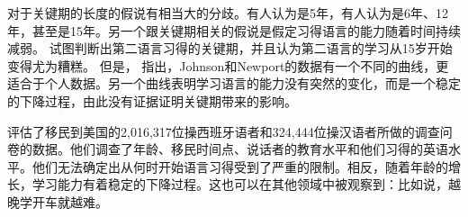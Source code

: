 对于关键期的长度的假说有相当大的分歧。有人认为是5年，有人认为是6年、12年，甚至是15年\citep[]{HBW2003a}。另一个跟关键期相关的假说是假定习得语言的能力随着时间持续减弱。
 \citet{JN89a}试图判断出第二语言习得的关键期，并且认为第二语言的学习从15岁开始变得尤为糟糕。\nocite{Sorace2003a}
但是， \citet*[\page]{EBJKSPP96a}指出，Johnson和Newport的数据有一个不同的曲线，更适合于个人数据。另一个曲线表明学习语言的能力没有突然的变化，而是一个稳定的下降过程，由此没有证据证明关键期带来的影响。

 \citet*{HBW2003a}评估了移民到美国的2,016,317位操西班牙语者和324,444位操汉语者所做的调查问卷的数据。他们调查了年龄、移民时间点、说话者的教育水平和他们习得的英语水平。他们无法确定出从何时开始语言习得受到了严重的限制。相反，随着年龄的增长，学习能力有着稳定的下降过程。这也可以在其他领域中被观察到：比如说，越晚学开车就越难。

